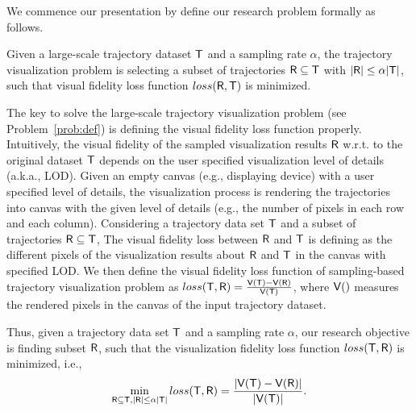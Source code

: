 We commence our presentation by define our research problem formally as follows.

\begin{problem}\label{prob:def}
Given a large-scale trajectory dataset $\mathsf{T}$ and a sampling rate $\alpha$,
the trajectory visualization problem is selecting a subset of trajectories $\mathsf{R} \subseteq \mathsf{T}$ with $|\mathsf{R}| \leq \alpha |\mathsf{T}|$,
such that visual fidelity loss function $loss(\mathsf{R},\mathsf{T})$ is minimized.
\end{problem}



The key to solve the large-scale trajectory visualization problem (see Problem~\ref{prob:def}) is defining the visual fidelity loss function properly.
Intuitively, the visual fidelity of the sampled visualization results $\mathsf{R}$ w.r.t. to the original dataset $\mathsf{T}$ depends on the user specified visualization level of details (a.k.a., LOD).
Given an empty canvas (e.g., displaying device) with a user specified level of details,
the visualization process is rendering the trajectories into canvas with the given level of details (e.g., the number of pixels in each row and each column).
Considering a trajectory data set $\mathsf{T}$ and a subset of trajectories $\mathsf{R} \subseteq \mathsf{T}$,
The visual fidelity loss between $\mathsf{R}$ and $\mathsf{T}$ is defining as the different pixels of the visualization results about $\mathsf{R}$ and $\mathsf{T}$ in the canvas with specified LOD.
We then define the visual fidelity loss function of sampling-based trajectory visualization problem as $loss(\mathsf{T}, \mathsf{R}) = \frac{\mathsf{V}(\mathsf{T}) - \mathsf{V}(\mathsf{R})}{\mathsf{V}(\mathsf{T})}$,
where $\mathsf{V}()$ measures the rendered pixels in the canvas of the input trajectory dataset.

Thus, given a trajectory data set $\mathsf{T}$ and a sampling rate $\alpha$,
our research objective is finding subset $\mathsf{R}$, such that  the visualization fidelity loss function $loss(\mathsf{T}, \mathsf{R})$ is minimized,
i.e.,
$$ \min_{\mathsf{R} \subseteq \mathsf{T}, |\mathsf{R}| \leq \alpha |\mathsf{T}|}  loss(\mathsf{T}, \mathsf{R}) =  \frac{|\mathsf{V}(\mathsf{T}) - \mathsf{V}(\mathsf{R})|}{|\mathsf{V}(\mathsf{T})|}. $$ %


